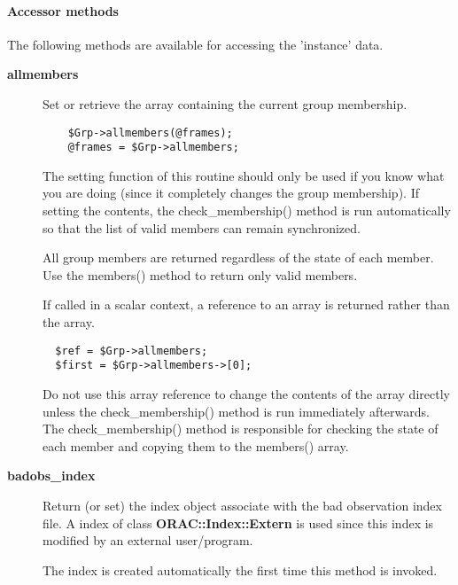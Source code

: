\paragraph*{Accessor methods\label{ORAC::Group_Accessor_methods}}

The following methods are available for accessing the 
'instance' data.

\begin{description}
\item[\textbf{allmembers}] \mbox{}

Set or retrieve the array containing the current group membership.

\begin{verbatim}
    $Grp->allmembers(@frames);
    @frames = $Grp->allmembers;
\end{verbatim}


The setting function of this routine should only be used
if you know what you are doing (since it completely changes the group
membership). If setting the contents, the check\_membership() method
is run automatically so that the list of valid members can remain
synchronized.



All group members are returned regardless of the state of each member.
Use the members() method to return only valid members.



If called in a scalar context, a reference to an array is returned
rather than the array.

\begin{verbatim}
  $ref = $Grp->allmembers;
  $first = $Grp->allmembers->[0];
\end{verbatim}


Do not use this array reference to change the contents of the array
directly unless the check\_membership() method is run immediately
afterwards. The check\_membership() method is responsible for 
checking the state of each member and copying them to the members()
array.

\item[\textbf{badobs\_index}] \mbox{}

Return (or set) the index object associate with the bad observation
index file. A index of class \textbf{ORAC::Index::Extern} is used since 
this index is modified by an external user/program.



The index is created automatically the first time this method
is invoked.


\end{description}
